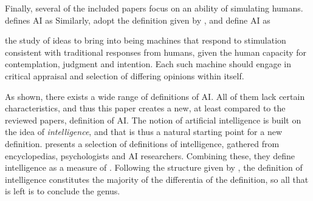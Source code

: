 Finally, several of the included papers focus on an ability of simulating humans. \textcite[p. 3-4]{Liu_2021} defines AI as  Similarly, \textcite[p. 3]{vanBruxvoort_2021} adopt the definition given by \textcite{Shubhendu_2013}, and define AI as
\begin{displayquote}
    the study of ideas to bring into being machines that respond to stimulation consistent with traditional responses from humans, given the human capacity for contemplation, judgment and intention. Each such machine should engage in critical appraisal and selection of differing opinions within itself.
\end{displayquote}

As shown, there exists a wide range of definitions of AI. All of them lack certain characteristics, and thus this paper creates a new, at least compared to the reviewed papers, definition of AI. The notion of artificial intelligence is built on the idea of \textit{intelligence}, and that is thus a natural starting point for a new definition. \textcite{Legg_2007} presents a selection of definitions of intelligence, gathered from encyclopedias, psychologists and AI researchers. Combining these, they define intelligence as a measure of  \parencite[p. 9]{Legg_2007}. Following the structure given by \textcite{Seppälä_2014}, the definition of intelligence constitutes the majority of the differentia of the definition, so all that is left is to conclude the genus.

